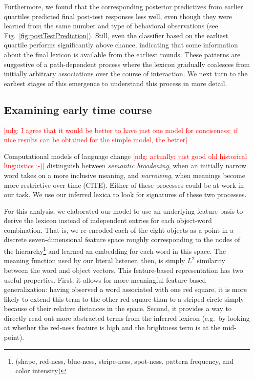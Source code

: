\documentclass[10pt,letterpaper]{article}
\newcommand{\ndg}[1]{\textcolor{Green}{[ndg: #1]}}
\newcommand{\mf}[1]{\textcolor{Red}{[ndg: #1]}}
\begin{document}
Furthermore, we found that the corresponding posterior predictives from earlier quartiles predicted final post-test responses less well, even though they were learned from the same number and type of behavioral observations (see Fig.\ \ref{fig:postTestPrediction}). Still, even the classifier based on the earliest quartile performs significantly above chance, indicating that some information about the final lexicon is available from the earliest rounds. These patterns are suggestive of a path-dependent process where the lexicon gradually coalesces from initially arbitrary associations over the course of interaction. We next turn to the earliest stages of this emergence to understand this process in more detail.

\subsection{Examining early time course}


\mf{I agree that it would be better to have just one model for conciseness; if nice results can be obtained for the simple model, the better}

Computational models of language change \mf{actually: just good old historical linguistics ;-)} distinguish between \emph{semantic broadening}, when an initially narrow word takes on a more inclusive meaning, and \emph{narrowing}, when meanings become more restrictive over time (CITE). Either of these processes could be at work in our task. We use our inferred lexica to look for signatures of these two processes. %

For this analysis, we elaborated our model to use an underlying feature basis to derive the lexicon instead of independent entries for each object-word combination. 
That is, we re-encoded each of the eight objects as a point in a discrete seven-dimensional feature space roughly corresponding to the nodes of the hierarchy\footnote{(shape, red-ness, blue-ness, stripe-ness, spot-ness, pattern frequency, and color intensity)} and learned an embedding for each word in this space. The meaning function used by our literal listener, then, is simply $L^2$ similarity between the word and object vectors. This feature-based representation has two useful properties. First, it allows for more meaningful feature-based generalization: having observed a word associated with one red square, it is more likely to extend this term to the other red square than to a striped circle simply because of their relative distances in the space. Second, it provides a way to directly read out more abstracted terms from the inferred lexicon (e.g.\ by looking at whether the red-ness feature is high and the brightness term is at the mid-point). 
\end{document}
